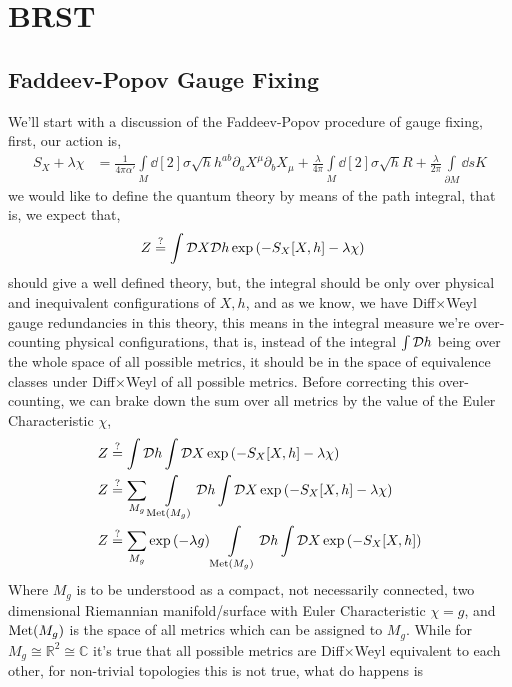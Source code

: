 \section{BRST}
\subsection{Faddeev-Popov Gauge Fixing}

We'll start with a discussion of the Faddeev-Popov procedure of gauge fixing, first, our action is,
\begin{align*}
    S_{X}+\lambda\chi&=\frac{1}{4\pi\alpha'}\int\limits_M\dd[2]{\sigma}\sqrt{h}h^{ab}\partial_a X^\mu\partial_b X_\mu+\frac\lambda{4\pi}\int\limits_M\dd[2]{\sigma}\sqrt{h}R+\frac\lambda{2\pi}\int\limits_{\partial M}\dd{s}K
\end{align*}
we would like to define the quantum theory by means of the path integral, that is, we expect that,
\begin{align*}
    Z&\stackrel{?}{=}\int\mathcal D X\mathcal D h\exp\qty(-S_X\qty[X,h]-\lambda\chi)
\end{align*}
should give a well defined theory, but, the integral should be only over physical and inequivalent configurations of 
$X,h$, and as we know, we have Diff$\times$Weyl gauge redundancies in this theory, this means in the integral measure we're 
over-counting physical configurations, that is, instead of the integral $\int\mathcal D h$ being over the whole space of all possible 
metrics, it should be in the space of equivalence classes under Diff$\times$Weyl of all possible metrics. Before correcting this over-counting, 
we can brake down the sum over all metrics by the value of the Euler Characteristic $\chi$, 
\begin{align*}
    Z&\stackrel{?}{=}\int\mathcal D h\int\mathcal D X\exp\qty(-S_X\qty[X,h]-\lambda\chi)\\
    Z&\stackrel{?}{=}\sum\limits_{M_g}\int\limits_{\textnormal{Met}\qty(M_g)}\mathcal D h\int\mathcal D X\exp\qty(-S_X\qty[X,h]-\lambda\chi)\\
    Z&\stackrel{?}{=}\sum\limits_{M_g}\exp\qty(-\lambda g)\int\limits_{\textnormal{Met}\qty(M_g)}\mathcal D h\int\mathcal D X\exp\qty(-S_X\qty[X,h])
\end{align*}
Where $M_g$ is to be understood as a compact, not necessarily connected, two dimensional Riemannian manifold/surface with Euler Characteristic $\chi=g$, and 
$\textnormal{Met}\qty(M_g)$ is the space of all metrics which can be assigned to $M_g$. While for $M_g\cong\mathbb R^2\cong \mathbb C$ it's true 
that all possible metrics are Diff$\times$Weyl equivalent to each other, for non-trivial topologies this is not true, what do happens is 
